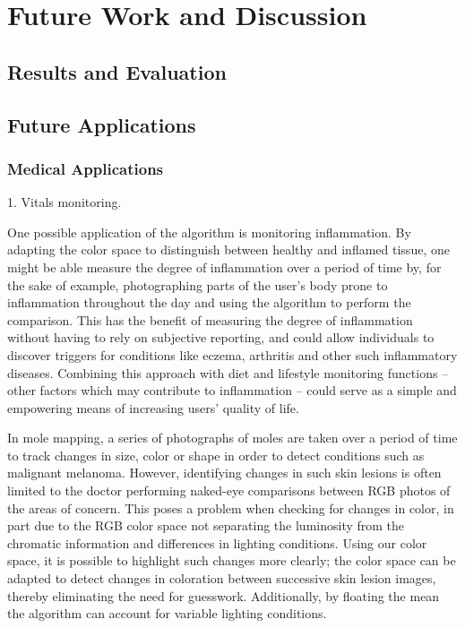 
\chapter{Future Work and Discussion}

\ifpdf
    \graphicspath{{Chapter5/Figs/Raster/}{Chapter5/Figs/PDF/}{Chapter5/Figs/}}
\else
    \graphicspath{{Chapter5/Figs/Vector/}{Chapter5/Figs/}}
\fi
\section{Results and Evaluation}\label{sec:ResultsAndEvaluation}

\section{Future Applications}\label{sec:FutureApplications}


\subsection{Medical Applications}\label{sec:MedicalApplications}
1. Vitals monitoring.

One possible application of the algorithm is monitoring inflammation. By adapting the color space to distinguish between healthy and inflamed tissue, one might be able measure the degree of inflammation over a period of time by, for the sake of example, photographing parts of the user's body prone to inflammation throughout the day and using the algorithm to perform the comparison. This has the benefit of measuring the degree of inflammation without having to rely on subjective reporting, and could allow individuals to discover triggers for conditions like eczema, arthritis and other such inflammatory diseases. Combining this approach with diet and lifestyle monitoring functions -- other factors which may contribute to inflammation -- could serve as a simple and empowering means of increasing users' quality of life.


In mole mapping, a series of photographs of moles are taken over a period of time to track changes in size, color or shape in order to detect conditions such as malignant melanoma. However, identifying changes in such skin lesions is often limited to the doctor performing naked-eye comparisons between RGB photos of the areas of concern. This poses a problem when checking for changes in color, in part due to the RGB color space not separating the luminosity from the chromatic information and differences in lighting conditions. Using our color space, it is possible to highlight such changes more clearly; the color space can be adapted to detect changes in coloration between successive skin lesion images, thereby eliminating the need for guesswork. Additionally, by floating the mean the algorithm can account for variable lighting conditions.

